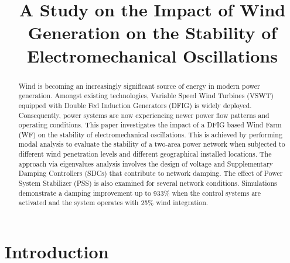 \documentclass[conference,11pt]{IEEEtran}
\begin{document}
\title{A Study on the Impact of Wind Generation on the Stability of Electromechanical Oscillations}

\author{
}

\maketitle

\thispagestyle{plain}

\begin{abstract}

Wind is becoming an increasingly significant source of energy in modern power generation. Amongst existing technologies, Variable Speed Wind Turbines (VSWT) equipped with Double Fed Induction Generators (DFIG) is widely deployed. Consequently, power systems are now experiencing newer power flow patterns and operating conditions. This paper investigates the impact of a DFIG based Wind Farm (WF) on the stability of electromechanical oscillations. This is achieved by performing modal analysis to evaluate the stability of a two-area power network when subjected to different wind penetration levels and different geographical installed locations. The approach via eigenvalues analysis involves the design of voltage and Supplementary Damping Controllers (SDCs) that contribute to network damping. The effect of Power System Stabilizer (PSS) is also examined for several network conditions. Simulations demonstrate a damping improvement up to 933\% when the control systems are activated and the system operates with 25\% wind integration. 

\end{abstract}

\pagestyle{plain}
\section{Introduction}
\end{document}
